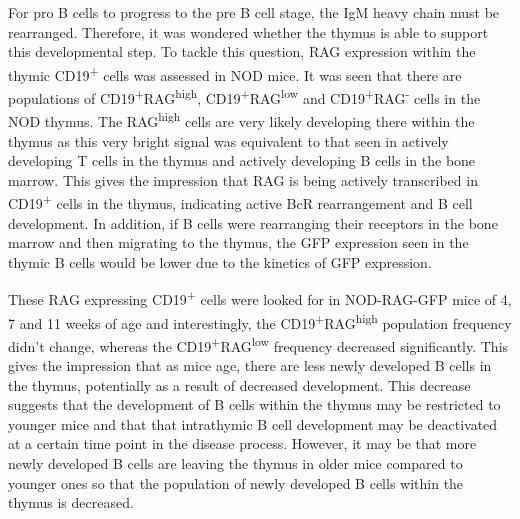 For pro B cells to progress to the pre B cell stage, the IgM heavy chain must be rearranged.
Therefore, it was wondered whether the thymus is able to support this developmental step.
To tackle this question, RAG expression within the thymic CD19\textsuperscript{+} cells was assessed in NOD mice.
It was seen that there are populations of CD19\textsuperscript{+}RAG\textsuperscript{high}, CD19\textsuperscript{+}RAG\textsuperscript{low} and CD19\textsuperscript{+}RAG\textsuperscript{-} cells in the NOD thymus.
The RAG\textsuperscript{high} cells are very likely developing there within the thymus as this very bright signal was equivalent to that seen in actively developing T cells in the thymus and actively developing B cells in the bone marrow.
This gives the impression that RAG is being actively transcribed in CD19\textsuperscript{+} cells in the thymus, indicating active BcR rearrangement and B cell development.
In addition, if B cells were rearranging their receptors in the bone marrow and then migrating to the thymus, the GFP expression seen in the thymic B cells would be lower due to the kinetics of GFP expression.

These RAG expressing CD19\textsuperscript{+} cells were looked for in NOD-RAG-GFP mice of 4, 7 and 11 weeks of age and interestingly, the CD19\textsuperscript{+}RAG\textsuperscript{high} population frequency didn't change, whereas the CD19\textsuperscript{+}RAG\textsuperscript{low} frequency decreased significantly.
This gives the impression that as mice age, there are less newly developed B cells in the thymus, potentially as a result of decreased development.
This decrease suggests that the development of B cells within the thymus may be restricted to younger mice and that that intrathymic B cell development may be deactivated at a certain time point in the disease process.
However, it may be that more newly developed B cells are leaving the thymus in older mice compared to younger ones so that the population of newly developed B cells within the thymus is decreased.


